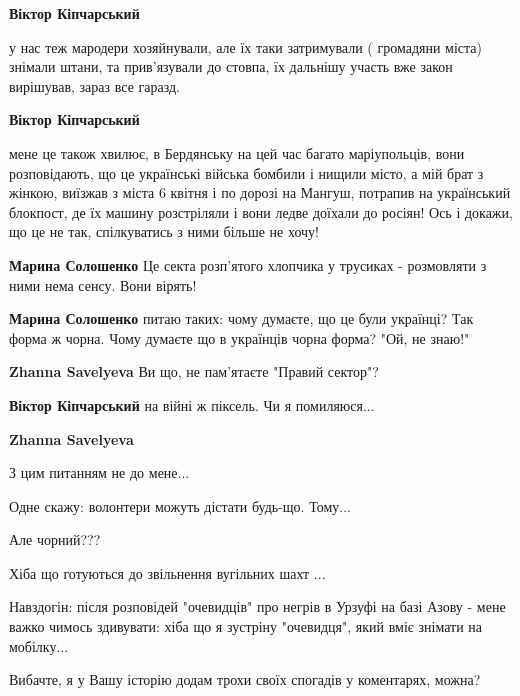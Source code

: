 \begin{itemize}
\textbf{Віктор Кіпчарський} 

у нас теж мародери хозяйнували, але їх таки затримували ( громадяни міста)
знімали штани, та прив'язували до стовпа, їх дальнішу участь вже закон
вирішував, зараз все гаразд.

\textbf{Віктор Кіпчарський} 

мене це також хвилює, в Бердянську на цей час багато маріупольців, вони
розповідають, що це українські війська бомбили і нищили місто, а мій брат з
жінкою, виїзжав з міста 6 квітня і по дорозі на Мангуш, потрапив на український
блокпост, де їх машину розстріляли і вони ледве доїхали до росіян! Ось і
докажи, що це не так, спілкуватись з ними більше не хочу!

\textbf{Марина Солошенко} Це секта розп'ятого хлопчика у трусиках - розмовляти з ними нема сенсу. Вони вірять!

\textbf{Марина Солошенко} питаю таких: чому думаєте, що це були українці? Так форма ж чорна. Чому думаєте що в українців чорна форма? "Ой, не знаю!"

\textbf{Zhanna Savelyeva} Ви що, не пам'ятаєте "Правий сектор"?

\textbf{Віктор Кіпчарський} на війні ж піксель. Чи я помиляюся...

\textbf{Zhanna Savelyeva} 

З цим питанням не до мене...

Одне скажу: волонтери можуть дістати будь-що. Тому...

Але чорний???

Хіба що готуються до звільнення вугільних шахт ...


Навздогін: після розповідей "очевидців" про негрів в Урзуфі на базі Азову -
мене важко чимось здивувати: хіба що я зустріну "очевидця", який вміє знімати
на мобілку...

\end{itemize} %


Вибачте, я у Вашу історію додам трохи своїх спогадів у коментарях, можна?

